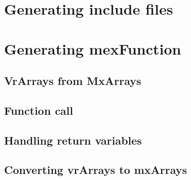 \section{Generating include files}
\section{Generating mexFunction}
\subsection{VrArrays from MxArrays}
\subsection{Function call}
\subsection{Handling return variables}
\subsection{Converting vrArrays to mxArrays}
